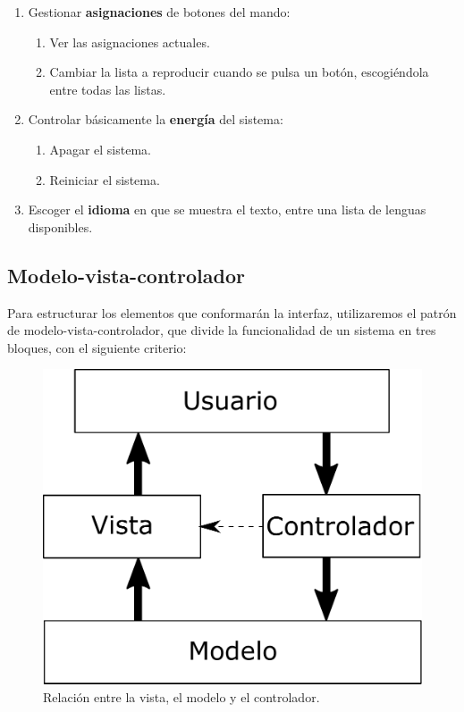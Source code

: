 \begin{enumerate}
	\item Gestionar \textbf{asignaciones} de botones del mando:
	
	\begin{enumerate}
		\item Ver las asignaciones actuales.
		\item Cambiar la lista a reproducir cuando se pulsa un botón, escogiéndola entre todas las listas.
	\end{enumerate}
	
	\item Controlar básicamente la \textbf{energía} del sistema:
	
	\begin{enumerate}
		\item Apagar el sistema.
		\item Reiniciar el sistema.
	\end{enumerate}
	
	\item Escoger el \textbf{idioma} en que se muestra el texto, entre una lista de lenguas disponibles.
\end{enumerate}

\subsection{Modelo-vista-controlador}

Para estructurar los elementos que conformarán la interfaz, utilizaremos el patrón de modelo-vista-controlador, que divide la funcionalidad de un sistema en tres bloques, con el siguiente criterio:

\smallskip

\begin{figure}[H]
	\noindent \begin{centering}
		\includegraphics[width=\linewidth/2]{capitulo4/mvc}
		\par\end{centering}
	\smallskip
	\caption{\label{fig:mvc} Relación entre la vista, el modelo y el controlador.}
\end{figure} 

